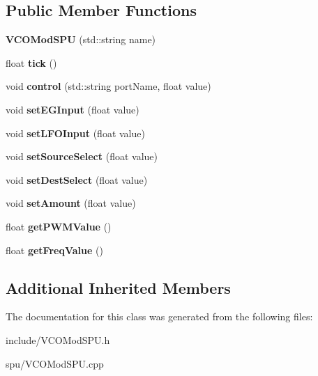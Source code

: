 \subsection*{Public Member Functions}
\begin{DoxyCompactItemize}
\item 
\hypertarget{classVCOModSPU_ae11ac554564dbae51b4f7d1a19f63dfc}{{\bfseries V\-C\-O\-Mod\-S\-P\-U} (std\-::string name)}\label{classVCOModSPU_ae11ac554564dbae51b4f7d1a19f63dfc}

\item 
\hypertarget{classVCOModSPU_a92982b411ee6a7d31eafa71678be6b63}{float {\bfseries tick} ()}\label{classVCOModSPU_a92982b411ee6a7d31eafa71678be6b63}

\item 
\hypertarget{classVCOModSPU_a300bde3f99008ce0b8a4ff38dc8c3201}{void {\bfseries control} (std\-::string port\-Name, float value)}\label{classVCOModSPU_a300bde3f99008ce0b8a4ff38dc8c3201}

\item 
\hypertarget{classVCOModSPU_afecf559bef09d7b469e3ebedddd05866}{void {\bfseries set\-E\-G\-Input} (float value)}\label{classVCOModSPU_afecf559bef09d7b469e3ebedddd05866}

\item 
\hypertarget{classVCOModSPU_a049f415e96c81b6dd63f99c7cc8fe35d}{void {\bfseries set\-L\-F\-O\-Input} (float value)}\label{classVCOModSPU_a049f415e96c81b6dd63f99c7cc8fe35d}

\item 
\hypertarget{classVCOModSPU_af1e0d57fcd491271ce0775bad41c168a}{void {\bfseries set\-Source\-Select} (float value)}\label{classVCOModSPU_af1e0d57fcd491271ce0775bad41c168a}

\item 
\hypertarget{classVCOModSPU_aaad0c1644bb9d44c33929fdb5c7a7ce2}{void {\bfseries set\-Dest\-Select} (float value)}\label{classVCOModSPU_aaad0c1644bb9d44c33929fdb5c7a7ce2}

\item 
\hypertarget{classVCOModSPU_a5c2f54cbe8e3d6a5bedd55783054da83}{void {\bfseries set\-Amount} (float value)}\label{classVCOModSPU_a5c2f54cbe8e3d6a5bedd55783054da83}

\item 
\hypertarget{classVCOModSPU_ad2434524030667ff7662bf4c0733cc77}{float {\bfseries get\-P\-W\-M\-Value} ()}\label{classVCOModSPU_ad2434524030667ff7662bf4c0733cc77}

\item 
\hypertarget{classVCOModSPU_ac1fef0a06f8362f8c723260cd3c6f0c2}{float {\bfseries get\-Freq\-Value} ()}\label{classVCOModSPU_ac1fef0a06f8362f8c723260cd3c6f0c2}

\end{DoxyCompactItemize}
\subsection*{Additional Inherited Members}


The documentation for this class was generated from the following files\-:\begin{DoxyCompactItemize}
\item 
include/V\-C\-O\-Mod\-S\-P\-U.\-h\item 
spu/V\-C\-O\-Mod\-S\-P\-U.\-cpp\end{DoxyCompactItemize}
